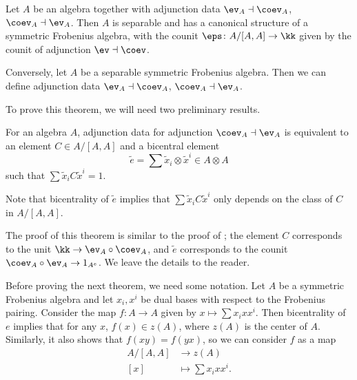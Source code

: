 \begin{theorem}\label{t:adjunction-frob2}
  Let $A$ be an algebra together with adjunction data $\ev_A\dashv\coev_A$,
  $\coev_A\dashv\ev_A$. Then $A$ is separable and has a canonical structure of a
  symmetric Frobenius algebra, with the counit $\eps\colon A/[A,A]\to \kk$ given
  by the counit of adjunction $\ev\dashv\coev$.

  Conversely, let $A$ be a separable symmetric Frobenius algebra. Then we can
  define adjunction data $\ev_A\dashv\coev_A$, $\coev_A\dashv\ev_A$.
\end{theorem}

To prove this theorem, we will need two preliminary results.

\begin{theorem}\label{t:adjunction-frob3}
  For an algebra $A$, adjunction data for adjunction $\coev_A\dashv\ev_A$ is
  equivalent to an element $C\in A/[A,A]$ and a bicentral element
  $$
    \tilde e=\sum\tilde x_i\otimes \tilde x^i\in A\otimes A
  $$
  such that $\sum \tilde x_i C \tilde x^i=1$.
\end{theorem}
Note that bicentrality of $\tilde e$ implies that $\sum \tilde x_i C \tilde
x^i$ only depends on the class of $C$ in $A/[A,A]$.

The proof of this theorem is similar to the proof of ;
the element $C$ corresponds to the unit $\kk \to \ev_A \circ \coev_A$, and $\tilde
e$ corresponds to the counit $\coev_A\circ \ev_A \to 1_{A^e}$. We leave the
details to the reader.



Before proving the next theorem, we need some notation. Let $A$ be a symmetric
Frobenius algebra and let $x_i, x^i$ be dual bases with respect to the Frobenius
pairing. Consider the map $f\colon A\to A$ given by $x\mapsto \sum x_i xx^i$.
Then bicentrality of $e$ implies that for any $x$, $f(x)\in z(A)$, where $z(A)$
is the center of $A$. Similarly, it also shows that $f(xy)=f(yx)$, so we can
consider $f$ as a map
\begin{equation}\label{e:coinv-inv}
  \begin{aligned}
    A/[A,A]&\to z(A)\\
    [x]&\mapsto \sum x_ixx^i.
  \end{aligned}
\end{equation}



